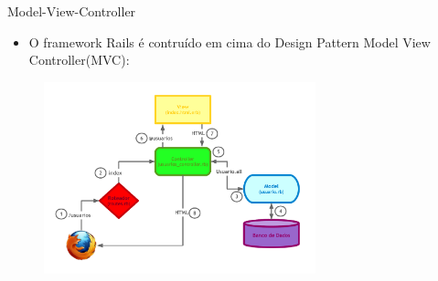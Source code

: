 \begin{frame}[t, fragile]{Model-View-Controller}
	\begin{itemize}
		\item O framework Rails é contruído em cima do Design Pattern Model View Controller(MVC):
	\end{itemize}
	\begin{figure}[h!]
		\centering
		\includegraphics[width=0.70\textwidth]{imagens/mvc-1.pdf}
	\end{figure}
\end{frame}
 
